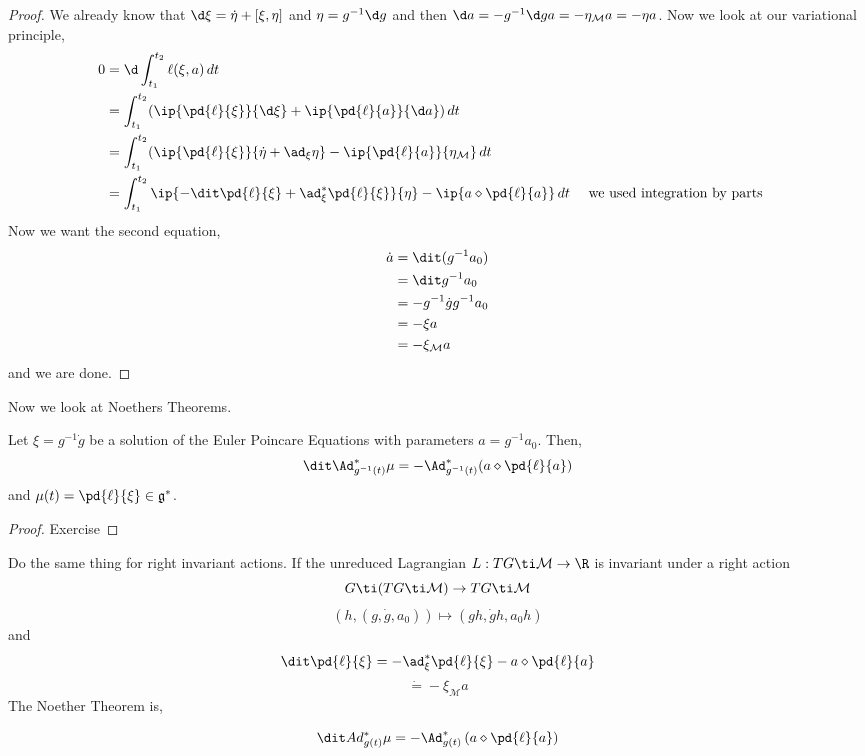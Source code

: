 \begin{proof}
  We already know that $\d \xi = \dot \eta + [\xi, \eta]$ and $\eta = g^{-1}\d g$ and then $\d a = -g^{-1}\d g a = -\eta_{\mathcal{M}} a = -\eta a$. Now we look at our variational principle,
  \begin{align*}
    0 &= \d\int_{t_1}^{t_2} \ell(\xi, a)\, dt \\
    &= \int_{t_1}^{t_2} (\ip{\pd{\ell}{\xi}}{\d \xi} + \ip{\pd{\ell}{a}}{\d a})\, dt \\
    &= \int_{t_1}^{t_2} (\ip{\pd{\ell}{\xi}}{\dot \eta + \ad_{\xi} \eta} - \ip{\pd{\ell}{a}}{\eta_\mathcal{M}}\, dt \\
    &= \int_{t_1}^{t_2} \ip{ -\dit \pd{\ell}{\xi} + \ad^*_\xi \pd{\ell}{\xi}}{\eta} - \ip{a \diamond \pd{\ell}{a}}\, dt && \text{ we used integration by parts}
  \end{align*}
  Now we want the second equation,
  \begin{align*}
    \dot a &= \dit (g^{-1}a_0) \\
    &= \dit g^{-1} a_0 \\
    &= -g^{-1}\dot g g^{-1} a_0 \\
    &= -\xi a \\
    &= -\xi_\mathcal{M} a
  \end{align*}
  and we are done.
\end{proof}

Now we look at Noethers Theorems.
\begin{nthm}
  Let $\xi = g^{-1}\dot g$ be a solution of the Euler Poincare Equations with parameters $a = g^{-1}a_0$. Then,
  $$ \dit \Ad^*_{g^{-1}(t)} \mu = -\Ad^*_{g^{-1}(t)} (a \diamond \pd{\ell}{a}) $$
  and $\mu(t) = \pd{\ell}{\xi} \in \mathfrak{g}^*$.
\end{nthm}
\begin{proof}
  Exercise
\end{proof}

\begin{exercise}
  Do the same thing for right invariant actions. If the unreduced Lagrangian $L : TG \ti \mathcal{M} \to \R$ is invariant under a right action
  $$G \ti (TG \ti \mathcal{M}) \to TG \ti \mathcal{M}$$
  $$ (h, (g, \dot g, a_0)) \mapsto (gh, \dot g h, a_0h) $$
  and
  $$ \dit \pd{\ell}{\xi} = -\ad^*_\xi \pd{\ell}{\xi} - a\diamond \pd{\ell}{a} $$
  $$ \dot  = -\xi_\mathcal{M}a $$
  The Noether Theorem is,
  \begin{nthm}
    $$ \dit Ad^*_{g(t)} \mu = -\Ad^*_{g(t)} \left(a \diamond \pd{\ell}{a}\right) $$
  \end{nthm}
\end{exercise}
